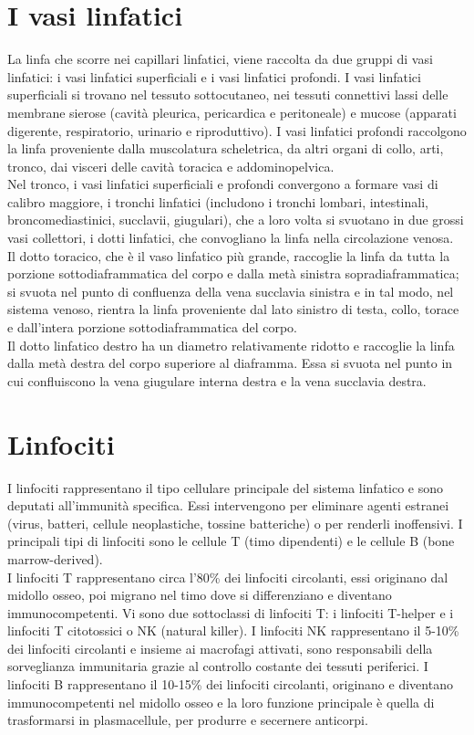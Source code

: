 \section{I vasi linfatici}
La linfa che scorre nei capillari linfatici, viene raccolta da due gruppi di vasi linfatici:
i vasi linfatici superficiali e i vasi linfatici profondi. 
I vasi linfatici superficiali si trovano nel tessuto sottocutaneo, nei tessuti connettivi lassi
delle membrane sierose (cavità pleurica, pericardica e peritoneale) e mucose (apparati digerente, respiratorio,
urinario e riproduttivo). I vasi linfatici profondi raccolgono la linfa proveniente dalla muscolatura scheletrica,
da altri organi di collo, arti, tronco, dai visceri delle cavità toracica e addominopelvica.\\ 
Nel tronco, i vasi linfatici superficiali e profondi convergono a formare vasi di calibro maggiore,
i tronchi linfatici (includono i tronchi lombari, intestinali, broncomediastinici, succlavii, giugulari),
che a loro volta si svuotano in due grossi vasi collettori, i dotti linfatici, che convogliano
la linfa nella circolazione venosa.\\
Il dotto toracico, che è il vaso linfatico più grande, raccoglie la linfa da tutta
la porzione sottodiaframmatica del corpo e dalla metà sinistra sopradiaframmatica; 
si svuota nel punto di confluenza della vena succlavia sinistra e in tal modo, nel sistema venoso,
rientra la linfa proveniente dal lato sinistro di testa, collo, torace e dall'intera porzione sottodiaframmatica del corpo.\\
Il dotto linfatico destro ha un diametro relativamente ridotto e raccoglie la linfa dalla metà destra
del corpo superiore al diaframma. Essa si svuota nel punto in cui confluiscono la vena giugulare interna destra e la vena succlavia destra. 

\section{Linfociti}
I linfociti rappresentano il tipo cellulare principale del sistema linfatico
e sono deputati all'immunità specifica. Essi intervengono per eliminare agenti estranei
(virus, batteri, cellule neoplastiche, tossine batteriche) o per renderli inoffensivi. 
I principali tipi di linfociti sono le cellule T (timo dipendenti) e le cellule B (bone marrow-derived).\\
I linfociti T rappresentano circa l'80\% dei linfociti circolanti, essi originano dal midollo osseo,
poi migrano nel timo dove si differenziano e diventano immunocompetenti. Vi sono due sottoclassi
di linfociti T: i linfociti T-helper e i linfociti T citotossici o NK (natural killer).
I linfociti NK rappresentano il 5-10\% dei linfociti circolanti e
insieme ai macrofagi attivati, sono responsabili della sorveglianza immunitaria
grazie al controllo costante dei tessuti periferici.
I linfociti B rappresentano il 10-15\% dei linfociti circolanti, originano e diventano immunocompetenti
nel midollo osseo e la loro funzione principale è quella di trasformarsi in plasmacellule, per produrre e secernere anticorpi.

